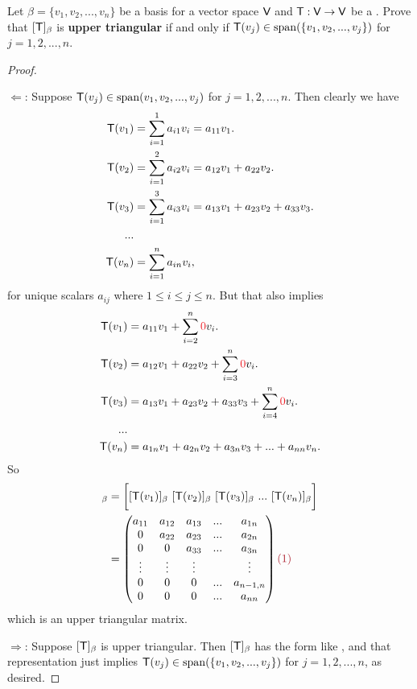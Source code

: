 \begin{exercise} \label{exercise 2.2.12}
Let \(\beta = \{ v_1, v_2, ..., v_n \}\) be a basis for a vector space \(\textsf{V}\) and \(\textsf{T} : \textsf{V} \to \textsf{V}\) be a \LTRAN{}.
Prove that \([\textsf{T}]_{\beta}\) is \textbf{upper triangular} if and only if \(\textsf{T}(v_j) \in \operatorname{span}(\{ v_1, v_2, ..., v_j \})\) for \(j = 1, 2, ..., n\).
\end{exercise}

\begin{proof} \ 

\(\Longleftarrow\): Suppose \(\textsf{T}(v_j) \in \operatorname{span}(v_1, v_2, ..., v_j)\) for \(j = 1, 2, ..., n\).
Then clearly we have
\begin{align*}
    \textsf{T}(v_1) & = \sum_{i = 1}^1 a_{i1} v_i = a_{11} v_1. \\
    \textsf{T}(v_2) & = \sum_{i = 1}^2 a_{i2} v_i = a_{12} v_1 + a_{22} v_2. \\
    \textsf{T}(v_3) & = \sum_{i = 1}^3 a_{i3} v_i = a_{13} v_1 + a_{23} v_2 + a_{33} v_3 . \\
    ... \\
    \textsf{T}(v_n) & = \sum_{i = 1}^n a_{in} v_i,
\end{align*}
for unique scalars \(a_{ij}\) where \(1 \le i \le j \le n\).
But that also implies
\begin{align*}
    \T(v_1) & = a_{11} v_1 + \sum_{i = 2}^n \RED{0} v_i. \\
    \T(v_2) & = a_{12} v_1 + a_{22} v_2 + \sum_{i = 3}^n \RED{0} v_i. \\
    \T(v_3) & = a_{13} v_1 + a_{23} v_2 + a_{33} v_3 + \sum_{i = 4}^n \RED{0} v_i. \\
    ... \\
    \T(v_n) & = a_{1n} v_1 + a_{2n} v_2 + a_{3n} v_3 + ... + a_{nn} v_n.
\end{align*}
So
\begin{align*}
    [\T]_{\beta} & = \bigg[ [\T(v_1)]_{\beta}\ [\T(v_2)]_{\beta}\ [\T(v_3)]_{\beta}\ ...\ [\T(v_n)]_{\beta} \bigg] \\
    & = \begin{pmatrix}
        a_{11} & a_{12} & a_{13} & ... & a_{1n} \\
        0      & a_{22} & a_{23} & ... & a_{2n} \\
        0      & 0      & a_{33} & ... & a_{3n} \\
        \vdots & \vdots & \vdots &     & \vdots \\
        0      &      0 &      0 & ... & a_{n-1,n} \\
        0      &      0 &      0 & ... & a_{nn}
    \end{pmatrix} \MAROON{(1)}
\end{align*}
which is an upper triangular matrix.

\(\Longrightarrow\): Suppose \([\textsf{T}]_{\beta}\) is upper triangular.
Then \([\textsf{T}]_{\beta}\) has the form like , and that representation just implies \(\textsf{T}(v_j) \in \operatorname{span}(\{ v_1, v_2, ..., v_j \})\) for \(j = 1, 2, ..., n\), as desired.
\end{proof}

